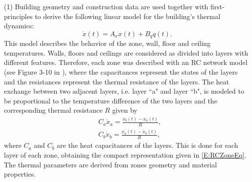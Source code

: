 \textcolor[rgb]{0,0,1}{(1) Building geometry and construction data are used together with first-principles to derive the following linear model for the building's thermal dynamics:
		\begin{equation}\label{E:RCZoneEq}
			\dot x(t) = A_x x(t) + B_q q(t).
		\end{equation}
		This model describes the behavior of the zone, wall, floor and ceiling temperatures.
		Walls, floors and ceilings are considered as divided into layers with different features. Therefore, each zone was described with an RC network model (see Figure 3-10 in \cite{SturzeneggerTR}), where the capacitances represent the states of the layers and the resistances represent the thermal resistance of the layers.
		The heat exchange between two adjacent layers, i.e. layer ``a" and layer ``b", is modeled to be proportional to the temperature difference of the two layers and the corresponding thermal resistance $R$ given by
		\begin{equation}\label{E:RCHeatExchange}
			\begin{aligned}
				&C_a\dot x_a = \frac{x_b(t) - x_a(t)}{R},\\
				&C_b\dot x_b =  \frac{x_a(t) - x_b(t)}{R},
			\end{aligned}
		\end{equation}
		where $C_a$ and $C_b$ are the heat capacitances of the layers. This is done for each layer of each zone, obtaining the compact representation given in \eqref{E:RCZoneEq}. The thermal parameters are derived from zones geometry and material properties.
}
		
